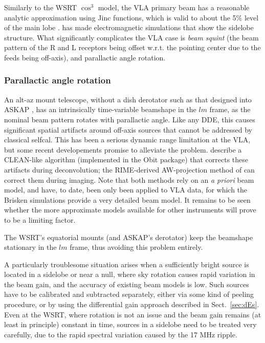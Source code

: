 \documentclass{aa}
\begin{document}
Similarly to the WSRT $\cos^3$ model, the VLA primary beam has a reasonable analytic approximation using Jinc functions, which is valid to about the 5\% level of the main lobe \citep{Uson-Cotton:VLA-beam}. \citet{Brisken:VLA-beam} has made electromagnetic simulations that show the sidelobe structure. What significantly complicates the VLA case is {\em beam squint} (the beam pattern of the R and L receptors being offset w.r.t. the pointing center due to the feeds being off-axis), and parallactic angle rotation.

\subsubsection{Parallactic angle rotation}

An alt-az mount telescope, without a dish derotator such as that designed into ASKAP \citep{ASKAP}, has an intrinsically time-variable beamshape in the $lm$ frame, as the nominal beam pattern rotates with parallactic angle. Like any DDE, this causes significant spatial artifacts around off-axis sources that cannot be addressed by classical selfcal. This has been a serious dynamic range limitation at the VLA, but some recent developements promise to alleviate the problem. \citet{Uson-Cotton:VLA-beam} describe a CLEAN-like algorithm (implemented in the Obit package) that corrects these artifacts during deconvolution; the RIME-derived AW-projection method of \citet{SB:imageplane} can correct them during imaging. Note that both methods rely on an \emph{a priori} beam model, and have, to date, been only been applied to VLA data, for which the Brisken simulations provide a very detailed beam model. It remains to be seen whether the more approximate models available for other instruments will prove to be a limiting factor.

The WSRT's equatorial mounts (and ASKAP's derotator) keep the beamshape stationary in the $lm$ frame, thus avoiding this problem entirely.

A particularly troublesome situation arises when a sufficiently bright source is located in a sidelobe or near a null, where sky rotation causes rapid variation in the beam gain, and the accuracy of existing beam models is low. Such sources have to be calibrated and subtracted separately, either via some kind of peeling procedure, or by using the differential gain approach described in Sect.~\ref{sec:dEs}. Even at the WSRT, where rotation is not an issue and the beam gain remains (at least in principle) constant in time, sources in a sidelobe need to be treated very carefully, due to the rapid spectral variation caused by the 17 MHz ripple.
\end{document}
